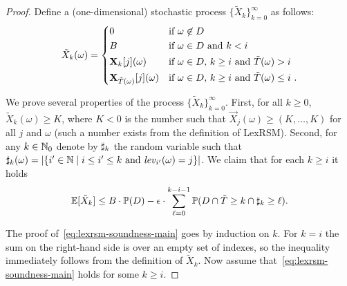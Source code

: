 \begin{proof}
Define a 
(one-dimensional) stochastic process $\{\tilde{X}_k\}_{k=0}^{\infty}$ as 
follows:
$$
\tilde{X}_k(\omega) = \begin{dcases}
0 & \text{if $\omega \not\in D$}\\
B & \text{if $\omega \in D$ and $k<i$ }\\
\mathbf{X}_{k}[j](\omega) & \text{if $\omega \in D$, $k\geq i$ and 
$\tilde{T}(\omega)>i$ 
}\\
\mathbf{X}_{\tilde{T}(\omega)}[j](\omega) & \text{if $\omega\in D$, $k\geq 
i$ and 
$\tilde{T}(\omega)\leq i$ }.
\end{dcases}
$$

We prove several properties of the process $\{\tilde{X}_k\}_{k=0}^{\infty}$. 
First, for all $k\geq 0$, $\tilde{X}_k(\omega)\geq K$, where $K<0$ is the 
number 
such that $\vec{X}_j(\omega)\geq (K,\dots,K)$ for all $j$ and $\omega$ (such a 
number 
exists from the definition of LexRSM). Second, for any $k\in \mathbb{N}_0$ denote by 
$\sharp_k$ the random variable such that $\sharp_k(\omega) = |\{i'\in 
\mathbb{N}\mid i \leq i' \leq k \text{ and } \mathit{lev}_{i'}(\omega)=j\} |$.
We claim 
that for each $k\geq i$ 
it holds 
\begin{equation}
\label{eq:lexrsm-soundness-main}
\mathbb{E}[\tilde{X}_k]\leq B\cdot \mathbb{P}(D) - \epsilon\cdot\sum_{\ell=0}^{k-i-1} \mathbb{P}(D 
\cap \tilde{T}\geq k \cap \sharp_k 
\geq 
\ell).
\end{equation}

The proof of~\eqref{eq:lexrsm-soundness-main} goes by induction on $k$. For 
$k=i$ the sum on the right-hand side is over an empty set of indexes, so the 
inequality immediately follows from the definition of $\tilde{X}_k$. Now assume 
that~\eqref{eq:lexrsm-soundness-main} holds for some $k\geq i$. 


	


% 
\end{proof}